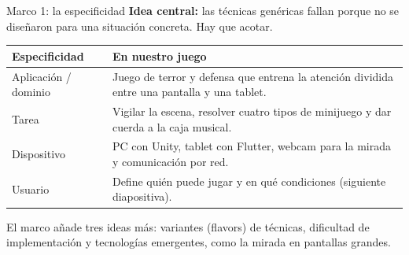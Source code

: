 \documentclass[aspectratio=169,11pt]{beamer}
\newcommand{\tagline}[1]{{\color{Teal}\bfseries\small #1}}
\newcommand{\smallnote}[1]{{\color{Muted}\scriptsize #1}}
\begin{document}
\begin{frame}{Marco 1: la especificidad}
  \small
  \tagline{Idea central:} las técnicas genéricas fallan porque no se diseñaron para una situación concreta. Hay que acotar.
  \vspace{.4em}

  \begin{tabular}{>{\RaggedRight\arraybackslash}p{.17\linewidth} >{\RaggedRight\arraybackslash}p{.74\linewidth}}
    \toprule
    \textbf{Especificidad} & \textbf{En nuestro juego}\\
    \midrule
    Aplicación / dominio & Juego de terror y defensa que entrena la atención dividida entre una pantalla y una tablet.\\[.3em]
    Tarea & Vigilar la escena, resolver cuatro tipos de minijuego y dar cuerda a la caja musical.\\[.3em]
    Dispositivo & PC con Unity, tablet con Flutter, webcam para la mirada y comunicación por red.\\[.3em]
    Usuario & Define quién puede jugar y en qué condiciones (siguiente diapositiva).\\
    \bottomrule
  \end{tabular}
  \vspace{.4em}

  \smallnote{El marco añade tres ideas más: variantes (flavors) de técnicas, dificultad de implementación y tecnologías emergentes, como la mirada en pantallas grandes.}
\end{frame}
\end{document}
